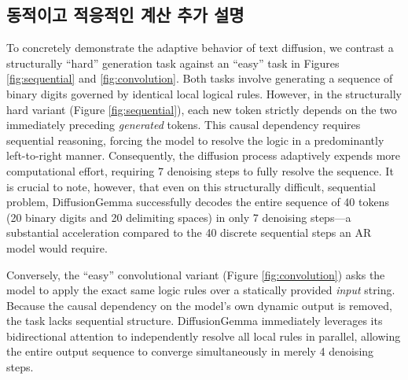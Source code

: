 \documentclass[11pt, a4paper, logo, copyright, gdm]{google}
\begin{document}
\newpage
\subsection{동적이고 적응적인 계산 추가 설명}\label{app:advantages_adaptive}
To concretely demonstrate the adaptive behavior of text diffusion, we contrast a structurally ``hard'' generation task against an ``easy'' task in Figures \ref{fig:sequential} and \ref{fig:convolution}. Both tasks involve generating a sequence of binary digits governed by identical local logical rules. However, in the structurally hard variant (Figure \ref{fig:sequential}), each new token strictly depends on the two immediately preceding \emph{generated} tokens. This causal dependency requires sequential reasoning, forcing the model to resolve the logic in a predominantly left-to-right manner. Consequently, the diffusion process adaptively expends more computational effort, requiring 7 denoising steps to fully resolve the sequence. It is crucial to note, however, that even on this structurally difficult, sequential problem, DiffusionGemma successfully decodes the entire sequence of 40 tokens (20 binary digits and 20 delimiting spaces) in only 7 denoising steps---a substantial acceleration compared to the 40 discrete sequential steps an AR model would require.

Conversely, the ``easy'' convolutional variant (Figure \ref{fig:convolution}) asks the model to apply the exact same logic rules over a statically provided \emph{input} string. Because the causal dependency on the model's own dynamic output is removed, the task lacks sequential structure. DiffusionGemma immediately leverages its bidirectional attention to independently resolve all local rules in parallel, allowing the entire output sequence to converge simultaneously in merely 4 denoising steps.
\end{document}
